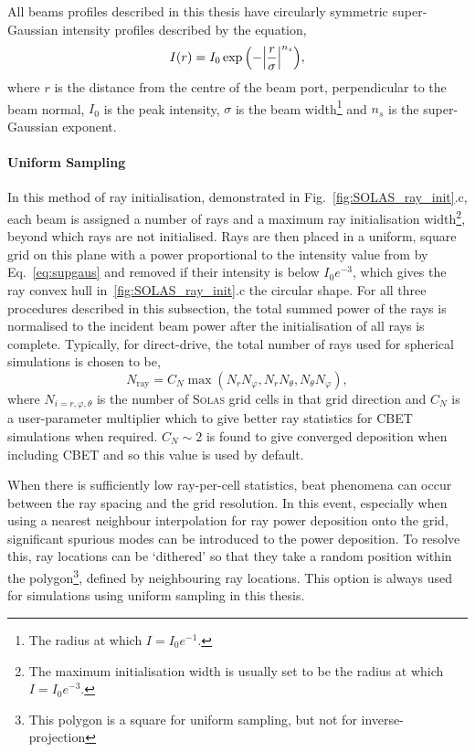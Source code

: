 All beams profiles described in this thesis have circularly symmetric super-Gaussian intensity profiles described by the equation,
\begin{equation}
    \label{eq:supgaus}
    I(r) = I_0 \exp{\Bigl( -\Bigl| \frac{r}{\sigma} \Bigr| ^{n_s} \Bigr)},
\end{equation}
where $r$ is the distance from the centre of the beam port, perpendicular to the beam normal, $I_0$ is the peak intensity, $\sigma$ is the beam width\footnote{The radius at which $I=I_0e^{-1}$.} and $n_s$ is the super-Gaussian exponent.

\paragraph*{Uniform Sampling}
In this method of ray initialisation, demonstrated in Fig.~\ref{fig:SOLAS_ray_init}.c, each beam is assigned a number of rays and a maximum ray initialisation width\footnote{The maximum initialisation width is usually set to be the radius at which $I=I_0e^{-3}$.}, beyond which rays are not initialised.
Rays are then placed in a uniform, square grid on this plane with a power proportional to the intensity value from by Eq.~\ref{eq:supgaus} and removed if their intensity is below $I_0e^{-3}$, which gives the ray convex hull in~\ref{fig:SOLAS_ray_init}.c the circular shape.
For all three procedures described in this subsection, the total summed power of the rays is normalised to the incident beam power after the initialisation of all rays is complete.
Typically, for direct-drive, the total number of rays used for spherical simulations is chosen to be,
\begin{equation}
    \label{eq:SOLAS_nray_uniform}
    N_{\text{ray}} = C_{N}\max{(N_r N_{\varphi},N_r N_{\theta},N_{\theta} N_{\varphi})},
\end{equation}
where $N_{i=r,\varphi,\theta}$ is the number of \textsc{Solas} grid cells in that grid direction and $C_N$ is a user-parameter multiplier which to give better ray statistics for CBET simulations when required.
$C_N\sim 2$ is found to give converged deposition when including \ac{CBET} and so this value is used by default.

When there is sufficiently low ray-per-cell statistics, beat phenomena can occur between the ray spacing and the grid resolution.
In this event, especially when using a nearest neighbour interpolation for ray power deposition onto the grid, significant spurious modes can be introduced to the power deposition.
To resolve this, ray locations can be `dithered' so that they take a random position within the polygon\footnote{This polygon is a square for uniform sampling, but not for inverse-projection}, defined by neighbouring ray locations.
This option is always used for simulations using uniform sampling in this thesis.

